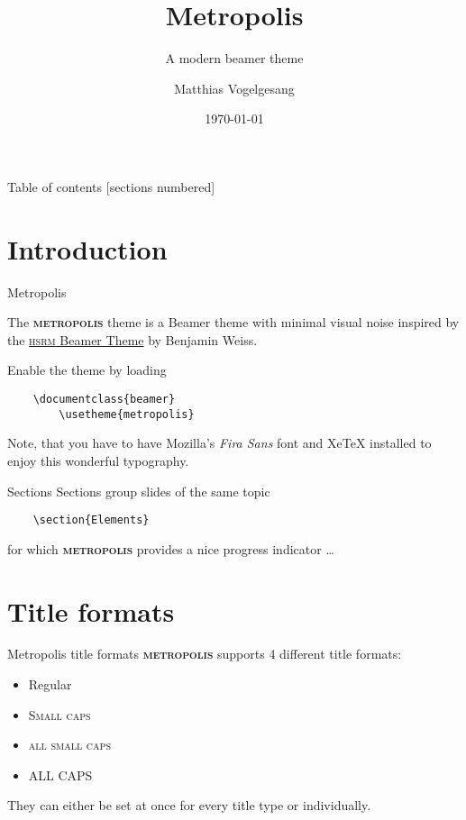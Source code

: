 \documentclass[10pt]{beamer}
\title{Metropolis}
\subtitle{A modern beamer theme}
\date{\today}
\author{Matthias Vogelgesang}
\institute{Center for modern beamer themes}
\newcommand{\themename}{\textbf{\textsc{metropolis}}\xspace}
\begin{document}
    
    \maketitle
    
    \begin{frame}{Table of contents}
      [sections numbered]
      \tableofcontents[hideallsubsections]
    \end{frame}
    
    \section{Introduction}
    
    \begin{frame}[fragile]{Metropolis}
    
      The \themename theme is a Beamer theme with minimal visual noise
      inspired by the \href{https://github.com/hsrmbeamertheme/hsrmbeamertheme}{\textsc{hsrm} Beamer
      Theme} by Benjamin Weiss.
    
      Enable the theme by loading
    
      \begin{verbatim}    \documentclass{beamer}
        \usetheme{metropolis}\end{verbatim}
    
      Note, that you have to have Mozilla's \emph{Fira Sans} font and XeTeX
      installed to enjoy this wonderful typography.
    \end{frame}
    \begin{frame}[fragile]{Sections}
      Sections group slides of the same topic
    
      \begin{verbatim}    \section{Elements}\end{verbatim}
    
      for which \themename provides a nice progress indicator \ldots
    \end{frame}
    
    \section{Title formats}
    
    \begin{frame}{Metropolis title formats}
        \themename supports 4 different title formats:
        \begin{itemize}
            \item Regular
            \item \textsc{Small caps}
            \item \textsc{all small caps}
            \item ALL CAPS
        \end{itemize}
        They can either be set at once for every title type or individually.
    \end{frame}
    
\end{document}
